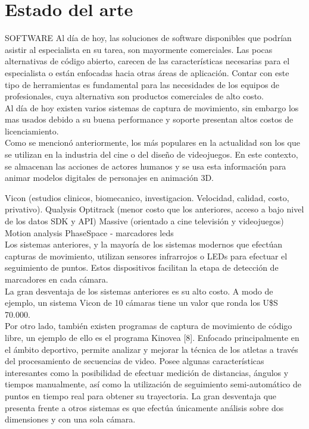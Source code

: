 \section{Estado del arte}\label{estadoDelArte}

SOFTWARE
Al  día  de  hoy, las  soluciones  de  software  disponibles que  podrían  asistir al especialista en su tarea, son mayormente comerciales. Las pocas alternativas de código abierto, carecen de las características necesarias para el especialista o están enfocadas hacia otras áreas de aplicación. Contar con este tipo de herramientas es fundamental para las necesidades de los equipos de profesionales, cuya alternativa son productos comerciales de alto costo.\\

 Al día de hoy existen varios sistemas de captura de movimiento, sin embargo los mas usados debido a su buena performance y soporte presentan altos costos de licenciamiento. 
\\ 


Como se mencionó anteriormente, los más populares en la actualidad son los que se utilizan en la industria del cine o del diseño de videojuegos. En este contexto, se almacenan las acciones de actores humanos y se usa esta información para animar modelos digitales de personajes en animación 3D.

Vicon (estudios clinicos, biomecanico, investigacion. Velocidad, calidad, costo, privativo).
Qualysis
Optitrack (menor costo que los anteriores, acceso a bajo nivel de los datos SDK y API)
Massive (orientado a cine televisión y videojuegos)
Motion analysis
PhaseSpace - marcadores leds
\\ 


Los sistemas anteriores, y la mayoría de los sistemas modernos que efectúan
capturas de movimiento, utilizan sensores infrarrojos o LEDs para efectuar el seguimiento
de puntos. Estos dispositivos facilitan la etapa de detección de marcadores
en cada cámara.\\

La gran desventaja de los sistemas anteriores es su alto costo. A modo de ejemplo,
un sistema Vicon de 10 cámaras tiene un valor que ronda los U\$S 70.000.\\

Por otro lado, también existen programas de captura de movimiento de código
libre, un ejemplo de ello es el programa Kinovea [8]. Enfocado principalmente en el
ámbito deportivo, permite analizar y mejorar la técnica de los atletas a través del
procesamiento de secuencias de video. Posee algunas características interesantes
como la posibilidad de efectuar medición de distancias, ángulos y tiempos manualmente,
así como la utilización de seguimiento semi-automático de puntos en
tiempo real para obtener su trayectoria. La gran desventaja que presenta frente a
otros sistemas es que efectúa únicamente análisis sobre dos dimensiones y con una
sola cámara.\\

